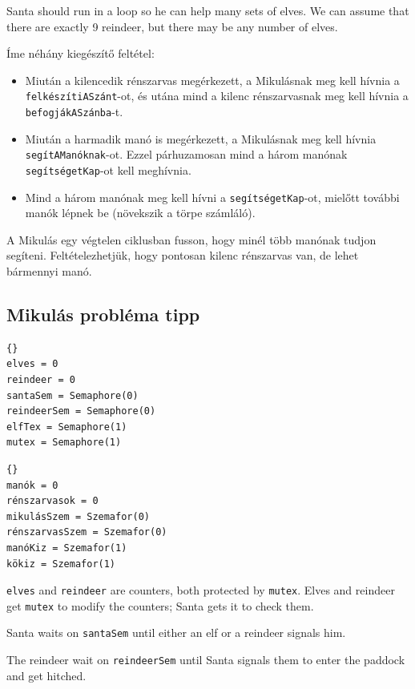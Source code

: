 \documentclass{book}
\newcommand{\clearemptydoublepage}{\newpage\cleardoublepage}
\begin{document}
Santa should run in a loop so he can help many sets of elves.
We can assume that there are exactly 9 reindeer, but there may
be any number of elves.  

Íme néhány kiegészítő feltétel:

\begin {itemize}

\item Miután a kilencedik rénszarvas megérkezett, a Mikulásnak meg kell
hívnia a {\tt felkészítiASzánt}-ot, és utána mind a kilenc rénszarvasnak meg
kell hívnia a {\tt befogjákASzánba}-t.

\item Miután a harmadik manó is megérkezett, a Mikulásnak meg kell
hívnia {\tt segítAManóknak}-ot. Ezzel párhuzamosan mind a három
manónak {\tt segítségetKap}-ot kell meghívnia.

\item Mind a három manónak meg kell hívni a {\tt segítségetKap}-ot, mielőtt további
manók lépnek be (növekszik a törpe számláló).

\end {itemize}
A Mikulás egy végtelen ciklusban fusson, hogy minél több manónak tudjon segíteni.
Feltételezhetjük, hogy pontosan kilenc rénszarvas van, de lehet bármennyi manó.

\clearemptydoublepage
\subsection{Mikulás probléma tipp}

\begin{lstlisting}[title={Santa problem hint}]{}
elves = 0
reindeer = 0
santaSem = Semaphore(0)
reindeerSem = Semaphore(0)
elfTex = Semaphore(1)
mutex = Semaphore(1)
\end{lstlisting}

\begin{lstlisting}[title={Mikulás probléma tipp}]{}
manók = 0
rénszarvasok = 0
mikulásSzem = Szemafor(0)
rénszarvasSzem = Szemafor(0)
manóKiz = Szemafor(1)
kökiz = Szemafor(1)
\end{lstlisting}

{\tt elves} and {\tt reindeer} are counters, both protected
by {\tt mutex}.  Elves and reindeer get {\tt mutex} to modify the
counters; Santa gets it to check them.

Santa waits on {\tt santaSem} until either an elf or a reindeer
signals him.

The reindeer wait on {\tt reindeerSem} until Santa signals them to
enter the paddock and get hitched.
\end{document}
